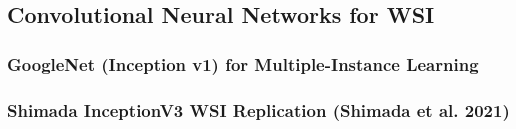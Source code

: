 \documentclass[11pt,a4paper]{article}
\begin{document}
\subsection{Convolutional Neural Networks for WSI}
\label{subsec:cnn_wsi}


\subsubsection{GoogleNet (Inception v1) for Multiple-Instance Learning}

\subsubsection{Shimada InceptionV3 WSI Replication (Shimada et al. 2021)}
\end{document}
